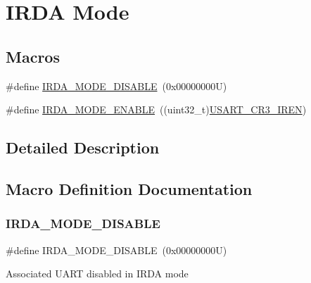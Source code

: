 \hypertarget{group___i_r_d_a___mode}{}\section{I\+R\+DA Mode}
\label{group___i_r_d_a___mode}
\subsection*{Macros}
\begin{DoxyCompactItemize}
\item 
\#define \hyperlink{group___i_r_d_a___mode_gaaa2d9e9ccafff98bcbb3744c149d2146}{I\+R\+D\+A\+\_\+\+M\+O\+D\+E\+\_\+\+D\+I\+S\+A\+B\+LE}~(0x00000000\+U)
\item 
\#define \hyperlink{group___i_r_d_a___mode_gad13d47ff38029e1b137334b505d72cb8}{I\+R\+D\+A\+\_\+\+M\+O\+D\+E\+\_\+\+E\+N\+A\+B\+LE}~((uint32\+\_\+t)\hyperlink{group___peripheral___registers___bits___definition_ga31c66373bfbae7724c836ac63b8411dd}{U\+S\+A\+R\+T\+\_\+\+C\+R3\+\_\+\+I\+R\+EN})
\end{DoxyCompactItemize}


\subsection{Detailed Description}


\subsection{Macro Definition Documentation}
\mbox{\label{group___i_r_d_a___mode_gaaa2d9e9ccafff98bcbb3744c149d2146}} 
\subsubsection{\texorpdfstring{I\+R\+D\+A\+\_\+\+M\+O\+D\+E\+\_\+\+D\+I\+S\+A\+B\+LE}{IRDA\_MODE\_DISABLE}}
{\footnotesize\ttfamily \#define I\+R\+D\+A\+\_\+\+M\+O\+D\+E\+\_\+\+D\+I\+S\+A\+B\+LE~(0x00000000\+U)}

Associated U\+A\+RT disabled in I\+R\+DA mode \mbox{\label{group___i_r_d_a___mode_gad13d47ff38029e1b137334b505d72cb8}} 
